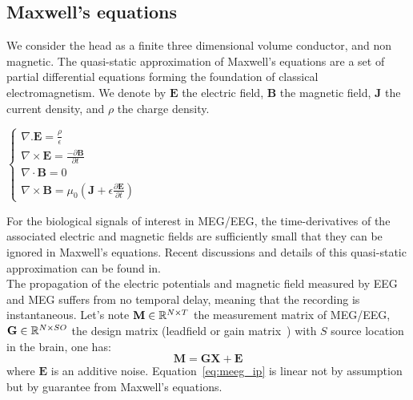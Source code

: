 \subsection*{Maxwell's equations}
We consider the head as a finite three dimensional volume conductor, and non magnetic. The quasi-static approximation of Maxwell's equations are a set of partial differential equations forming the foundation of classical electromagnetism. We denote by $\mathbf{E}$ the electric field, $\mathbf{B}$ the magnetic field, $\mathbf{J}$ the current density, and $\rho$ the charge density.

\begin{center}
$\left\{
\begin{array}{l}
  \nabla . \mathbf{E} = \frac{\rho}{\epsilon} \\
  \nabla \times \mathbf{E} = \frac{-\partial \mathbf{B}}{\partial t} \\
  \nabla \cdot \mathbf{B} = 0 \\
  \nabla \times \mathbf{B} = \mu_0 (\mathbf{J} + \epsilon\frac{\partial \mathbf{E}}{\partial t})
\end{array}
\right.$
\end{center}

For the biological signals of interest in MEG/EEG, the time-derivatives of the associated electric and magnetic fields are sufficiently small that they can be ignored in Maxwell’s equations. Recent discussions and details of this quasi-static approximation can be found in\cite{hamalainen1993magnetoencephalography,tripp1983physical,heller1992brain}.\\

The propagation of the electric potentials and magnetic field measured by EEG and MEG suffers from no temporal delay, meaning that the recording is instantaneous. Let's note $\mathbf{M}\in\mathbb{R}^{N\times T}$ the measurement matrix of MEG/EEG, $\mathbf{G}\in\mathbb{R}^{N\times SO}$ the design matrix (leadfield or gain matrix~\cite{h1994}) with $S$ source location in the brain, one has:
\begin{equation}
\mathbf{M} = \mathbf{GX}+\mathbf{E}
\end{equation} \label{eq:meeg_ip}
where $\mathbf{E}$ is an additive noise. Equation~\eqref{eq:meeg_ip} is linear not by assumption but by guarantee from Maxwell's equations.\\

